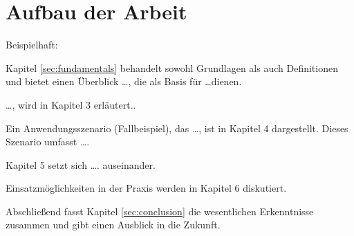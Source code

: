 \section{Aufbau der Arbeit}

Beispielhaft:

Kapitel \ref{sec:fundamentals} behandelt sowohl Grundlagen als auch Definitionen und bietet einen Überblick \dots, die als Basis für \dots dienen.

\dots, wird in Kapitel 3 erläutert..

Ein Anwendungsszenario (Fallbeispiel), das \dots, ist in Kapitel 4 dargestellt. Dieses Szenario umfasst \dots.

Kapitel 5 setzt sich \dots. auseinander.

Einsatzmöglichkeiten in der Praxis werden in Kapitel 6 diskutiert.

Abschließend fasst Kapitel \ref{sec:conclusion} die wesentlichen Erkenntnisse zusammen und gibt einen Ausblick in die Zukunft.

